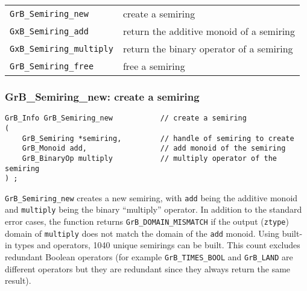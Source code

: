 \documentclass[12pt]{article}
\begin{document}
\vspace{0.2in}
{\footnotesize
\begin{tabular}{ll}
\hline
\verb'GrB_Semiring_new'       & create a semiring \\
\verb'GxB_Semiring_add'       & return the additive monoid of a semiring \\
\verb'GxB_Semiring_multiply'  & return the binary operator of a semiring \\
\verb'GrB_Semiring_free'      & free a semiring \\
\hline
\end{tabular}
}

\subsubsection{{\sf GrB\_Semiring\_new:} create a semiring}
\label{semiring_new}

\begin{mdframed}[userdefinedwidth=6in]
{\footnotesize
\begin{verbatim}
GrB_Info GrB_Semiring_new           // create a semiring
(
    GrB_Semiring *semiring,         // handle of semiring to create
    GrB_Monoid add,                 // add monoid of the semiring
    GrB_BinaryOp multiply           // multiply operator of the semiring
) ;
\end{verbatim}
} \end{mdframed}

\verb'GrB_Semiring_new' creates a new semiring, with \verb'add' being the
additive monoid and \verb'multiply' being the binary ``multiply'' operator.  In
addition to the standard error cases, the function returns
\verb'GrB_DOMAIN_MISMATCH' if the output (\verb'ztype') domain of
\verb'multiply' does not match the domain of the \verb'add' monoid.  Using
built-in types and operators, 1040 unique semirings can be built.  This count
excludes redundant Boolean operators (for example \verb'GrB_TIMES_BOOL' and
\verb'GrB_LAND' are different operators but they are redundant since they
always return the same result).
\end{document}
